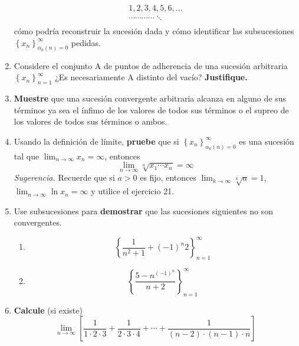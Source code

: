 \documentclass[12pt]{article}
\begin{document}
\begin{enumerate}
\begin{equation*}
\begin{split}
                1,2,3,4,5,6,\dots \\
                \cdots\cdots\cdots\cdots\ddots\\
            \end{split}
        \end{equation*}
        cómo podría reconstruir la sucesión dada y cómo identificar las subsucesiones $\left\{x_n\right\}_{\alpha_k\left(n\right)=0}^{\infty}$ pedidas.
    \item Considere el conjunto A de puntos de adherencia de una sucesión arbitraria $\left\{x_n\right\}_{n=1}^{\infty}$ ¿Es necesariamente A distinto del vacío? \textbf{Justifique.}
    \item \textbf{Muestre} que una sucesión convergente arbitraria alcanza en alguno de sus términos ya sea el ínfimo de los valores de todos sus términos o el supreo de los valores de todos sus términos o ambos.
    \item Usando la definición de límite, \textbf{pruebe} que si $\left\{x_n\right\}_{\alpha_k\left(n\right)=0}^{\infty}$ es una sucesión tal que $\lim_{n\rightarrow\infty}x_n=\infty$, entonces
        \begin{equation*}
            \lim_{n\rightarrow\infty}\sqrt[n]{x_1\cdots x_n}=\infty
        \end{equation*}
        \textit{Sugerencia. } Recuerde que si $a>0$ es fijo, entonces $\lim_{k\rightarrow\infty}\sqrt[k]{a}=1$, $\lim_{n\rightarrow\infty}\ln x_n=\infty$ y utilice el ejercicio 21.
    \item Use subsucesiones para \textbf{demostrar} que las sucesiones siguientes no son convergentes.
    \begin{multicols}{2}
        \begin{enumerate}
            \item \begin{equation*}
                    \left\{\frac{1}{n^2+1}+(-1)^n2\right\}_{n=1}^{\infty}
                \end{equation*}
            \item \begin{equation*}
                    \left\{\frac{5-n^{(-1)^n}}{n+2}\right\}_{n=1}^{\infty}
                \end{equation*}
        \end{enumerate}
    \end{multicols}
    \item \textbf{Calcule} (si existe)
    \begin{equation*}
        \lim_{n\rightarrow\infty}\left[\frac{1}{1\cdot2\cdot3}+\frac{1}{2\cdot3\cdot4}+\cdots+\frac{1}{(n-2)\cdot(n-1)\cdot n}\right]

\end{equation*}
\end{enumerate}
\end{document}

